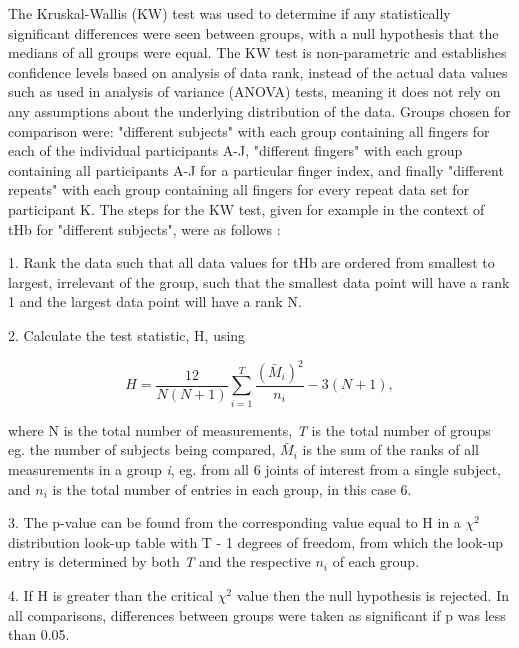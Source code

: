 \documentclass[twoside]{bhamthesis}
\theoremstyle{definition}
\begin{document}
The Kruskal-Wallis (KW) test was used to determine if any statistically significant differences were seen between groups, with a null hypothesis that the medians of all groups were equal. The KW test is non-parametric and establishes confidence levels based on analysis of data rank, instead of the actual data values such as used in analysis of variance (ANOVA) tests, meaning it does not rely on any assumptions about the underlying distribution of the data. Groups chosen for comparison were: "different subjects" with each group containing all fingers for each of the individual participants A-J,  "different fingers" with each group containing all participants A-J for a particular finger index, and finally "different repeats" with each group containing all fingers for every repeat data set for participant K. The steps for the KW test, given for example in the context of tHb for "different subjects", were as follows \cite{altman1990practical}:

1. Rank the data such that all data values for tHb are ordered from smallest to largest, irrelevant of the group, such that the smallest data point will have a rank 1 and the largest data point will have a rank N. 

2. Calculate the test statistic, H, using

\begin{equation}
 H =\frac{12}{N(N+1)} \sum_{i=1}^{T} \frac{(\bar{M}_i)^2}{n_i} - 3(N+1),
  \label{eqn:dark_noise}
\end{equation}

where N is the total number of measurements, \textit{T} is the total number of groups eg. the number of subjects being compared, $\bar{M}_i$ is the sum of the ranks of all measurements in a group \textit{i}, eg. from all 6 joints of interest from a single subject, and $n_i$ is the total number of entries in each group, in this case 6. 

3. The p-value can be found from the corresponding value equal to H in a $\chi^2$ distribution look-up table  with T - 1 degrees of freedom, from which the look-up entry is determined by both \textit{T} and the respective $n_i$ of each group.


4. If H is greater than the critical $\chi^2$ value then the null hypothesis is rejected. In all comparisons, differences between groups were taken as significant if p was less than 0.05. 
\end{document}
